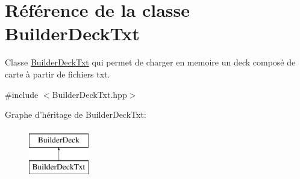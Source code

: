 \hypertarget{class_builder_deck_txt}{\section{Référence de la classe Builder\-Deck\-Txt}
\label{class_builder_deck_txt}
}


Classe \hyperlink{class_builder_deck_txt}{Builder\-Deck\-Txt} qui permet de charger en memoire un deck composé de carte à partir de fichiers txt.  




{\ttfamily \#include $<$Builder\-Deck\-Txt.\-hpp$>$}

Graphe d'héritage de Builder\-Deck\-Txt\-:\begin{figure}[H]
\begin{center}
\leavevmode
\includegraphics[height=2.000000cm]{class_builder_deck_txt}
\end{center}
\end{figure}
